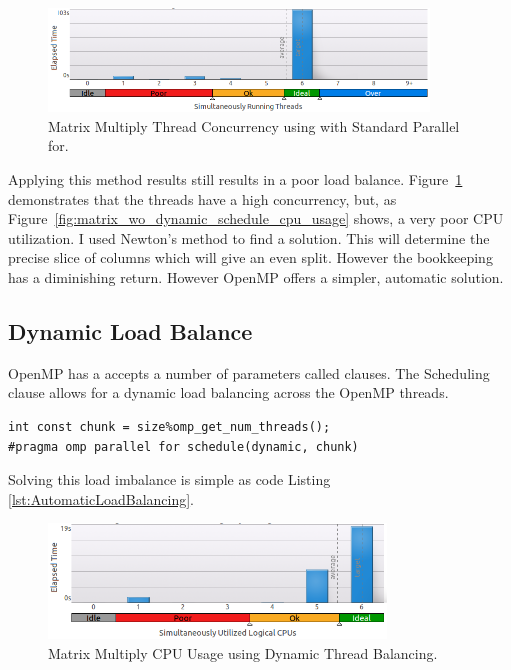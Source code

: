 \documentclass[journal,10pt,onecolumn,draftcls]{IEEEtran}
\begin{document}
\begin{figure}[!t]
\begin{center}
\includegraphics[width=0.9\textwidth]{figures/matrix_without_dynamic_schedule_thread_concurrency.png}
\caption{Matrix Multiply Thread Concurrency using with Standard Parallel for.}
\label{fig:matrix_wo_dynamic_schedule_concurrency}
\end{center}
\end{figure}

Applying this method results still results in a poor load balance.  
Figure~\ref{fig:matrix_wo_dynamic_schedule_concurrency} demonstrates that the threads have a high 
concurrency, but, as Figure~\ref{fig:matrix_wo_dynamic_schedule_cpu_usage} shows, a very poor CPU 
utilization. I used Newton's method to find a solution. This will determine the precise slice of
 columns which will give an even split. However the bookkeeping has a diminishing 
return.  However OpenMP offers a simpler, automatic solution.

\subsection{Dynamic Load Balance}
OpenMP has a accepts a number of parameters called clauses. The Scheduling clause allows
for a dynamic load balancing across the OpenMP threads. 

\label{lst:AutomaticLoadBalancing}
\begin{lstlisting}
int const chunk = size%omp_get_num_threads();
#pragma omp parallel for schedule(dynamic, chunk)
\end{lstlisting}
Solving this load imbalance is simple as code Listing \ref{lst:AutomaticLoadBalancing}.

\begin{figure}[!t]
\begin{center}
\includegraphics[width=0.8\textwidth]{figures/matrix_dynamic_schedule_cpu_usage.png}
\caption{Matrix Multiply CPU Usage using Dynamic Thread Balancing.}
\label{fig:matrix_dynamic_schedule_cpu_usage}
\end{center}
\end{figure}
\end{document}
